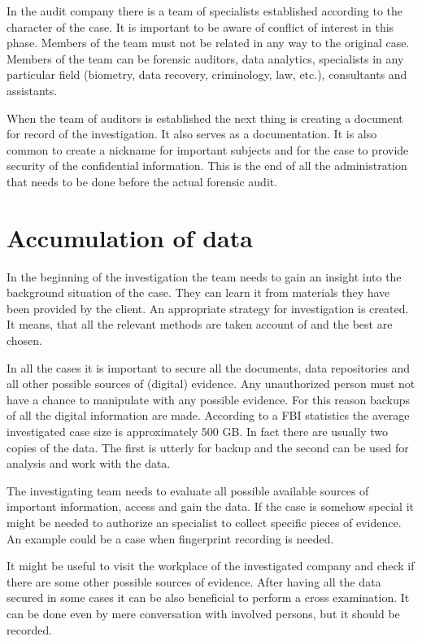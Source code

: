 In the audit company there is a team of specialists established according to the character of the case. It is important to be aware of conflict of interest in this phase. Members of the team must not be related in any way to the original case. Members of the team can be forensic auditors, data analytics, specialists in any particular field (biometry, data recovery, criminology, law, etc.), consultants and assistants. 

When the team of auditors is established the next thing is creating a document for record of the investigation. It also serves as a documentation. It is also common to create a nickname for important subjects and for the case to provide security of the confidential information. This is the end of all the administration that needs to be done before the actual forensic audit. 

\section{Accumulation of data}
In the beginning of the investigation the team needs to gain an insight into the background situation of the case. They can learn it from materials they have been provided by the client. An appropriate strategy for investigation is created. It means, that all the relevant methods are taken account of and the best are chosen. 

In all the cases it is important to secure all the documents, data repositories and all other possible sources of (digital) evidence. Any unauthorized person must not have a chance to manipulate with any possible evidence. For this reason backups of all the digital information are made. According to a FBI statistics the average investigated case size is approximately 500 GB.  In fact there are usually two copies of the data. The first is utterly for backup and the second can be used for analysis and work with the data. 

The investigating team needs to evaluate all possible available sources of important information, access and gain the data. If the case is somehow special it might be needed to authorize an specialist to collect specific pieces of evidence. An example could be a case when fingerprint recording is needed. 

It might be useful to visit the workplace of the investigated company and check if there are some other possible sources of evidence. After having all the data secured in some cases it can be also beneficial to perform a cross examination. It can be done even by mere conversation with involved persons, but it should be recorded.

